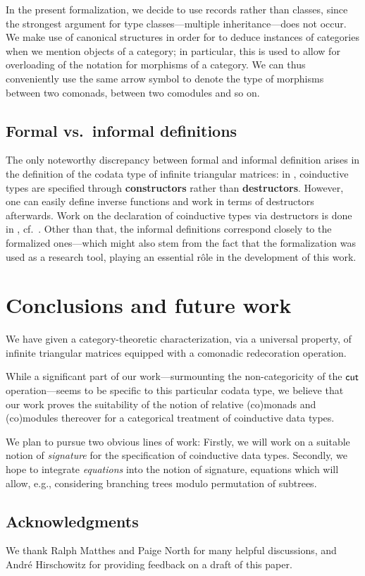 \documentclass{amsart}
\newcommand{\fat}[1]{\textbf{#1}}
\begin{document}
In the present formalization, we decide to use records rather than classes, since the strongest argument for type classes---multiple inheritance---does 
not occur.
We make use of canonical structures in order for \coq to deduce instances of categories when we mention objects of a category; 
in particular, this is used to allow for overloading of the notation for morphisms of a category.
We can thus conveniently use the same arrow symbol to denote the type of morphisms between two comonads, between two comodules and so on.


\subsection{Formal vs.\ informal definitions}

The only noteworthy discrepancy between formal and informal definition arises in the definition of the codata type of infinite 
triangular matrices:
in \coq, coinductive types are specified through \fat{constructors} rather than \fat{destructors}.
However, one can easily define inverse functions and work in terms of destructors afterwards.
Work on the declaration of coinductive types via destructors is done in \agda, cf.\ \parencite{DBLP:conf/popl/AbelPTS13}.
Other than that, the informal definitions correspond closely to the formalized ones---which might also stem from the fact that 
the formalization was used as a research tool, playing an essential r\^ole in the development of this work.

\section{Conclusions and future work}



We have given a category-theoretic characterization, via a universal property, of infinite triangular matrices
equipped with a comonadic redecoration operation.

While a significant part of our work---surmounting the non-categoricity of the $\mathsf{cut}$ operation---seems to be specific to this particular codata type,
we believe that our work proves the suitability of the notion of relative (co)monads and (co)modules thereover for 
a categorical treatment of coinductive data types.


We plan to pursue two obvious lines of work:
Firstly, we will work on a suitable notion of \emph{signature} for the specification of coinductive data types.
Secondly, we hope to integrate \emph{equations} into the notion of signature, equations which 
will allow, e.g., considering branching trees modulo permutation of subtrees.
 

\subsection*{Acknowledgments}
 We thank Ralph Matthes and Paige North for many helpful discussions, and Andr\'e Hirschowitz for providing feedback on
 a draft of this paper.

\printbibliography


\appendix


\end{document}

